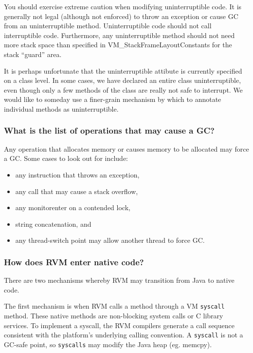 You should exercise extreme caution when modifying uninterruptible code.  It
is generally not legal (although not enforced) to throw an exception or 
cause GC from an uninterruptible method.  Uninterruptible code should not
call interruptible code. Furthermore, any uninterruptible method should
not need more stack space than specified in VM\_StackFrameLayoutConstants
for the stack ``guard'' area.

It is perhaps unfortunate that the uninterruptible attibute is currently
specified on a class level.  In some cases, we have declared an entire
class uninterruptible, even though only a few methods of the class are
really not safe to interrupt.  We would like to someday use a finer-grain
mechanism by which to annotate individual methods as uninterruptible.

\subsubsection{What is the list of operations that may cause a GC?}

Any operation that allocates memory or causes memory to be allocated may
force a GC.  Some cases to look out for include:
\begin{itemize}
\item any instruction that throws an exception,
\item any call that may cause a stack overflow,
\item any monitorenter on a contended lock,
\item string concatenation, and
\item any thread-switch point may allow another thread to force GC.
\end{itemize}

\subsubsection{How does RVM enter native code?}

There are two mechanisms whereby RVM may transition from Java to native
code.

The first mechanism is when RVM calls a method through a VM {\tt syscall}
method.  These native methods are non-blocking system calls or C library 
services.  To implement a syscall, the RVM compilers generate a call
sequence consistent with the platform's underlying calling convention.
A {\tt syscall} is not a GC-safe point, so {\tt syscalls} may modify the
Java heap (eg. memcpy).

